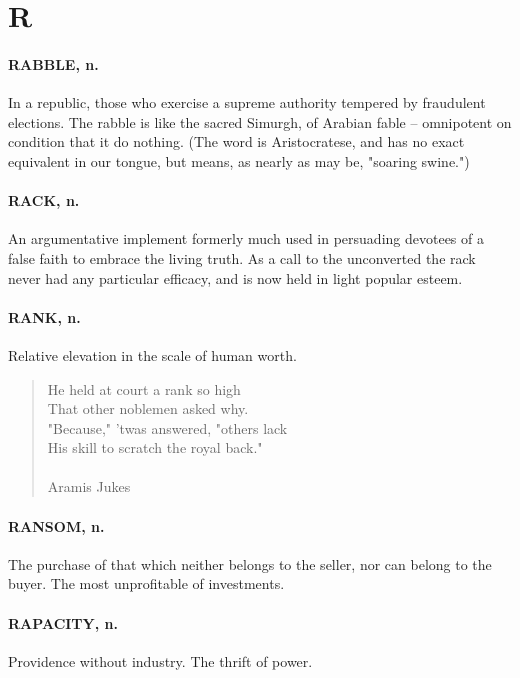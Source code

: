 \documentclass[11pt]{article}
\begin{document}
\section*{R}



\paragraph{RABBLE, n.}  In a republic, those who exercise a supreme authority
tempered by fraudulent elections.  The rabble is like the sacred
Simurgh, of Arabian fable -- omnipotent on condition that it do
nothing.  (The word is Aristocratese, and has no exact equivalent in
our tongue, but means, as nearly as may be, "soaring swine.")

\paragraph{RACK, n.}  An argumentative implement formerly much used in persuading
devotees of a false faith to embrace the living truth.  As a call to
the unconverted the rack never had any particular efficacy, and is now
held in light popular esteem.

\paragraph{RANK, n.}  Relative elevation in the scale of human worth.

\begin{quote}   He held at court a rank so high \\
  That other noblemen asked why. \\
  "Because," 'twas answered, "others lack \\
  His skill to scratch the royal back." \\
 \\
Aramis Jukes \end{quote}


\paragraph{RANSOM, n.}  The purchase of that which neither belongs to the seller,
nor can belong to the buyer.  The most unprofitable of investments.

\paragraph{RAPACITY, n.}  Providence without industry.  The thrift of power.
\end{document}

